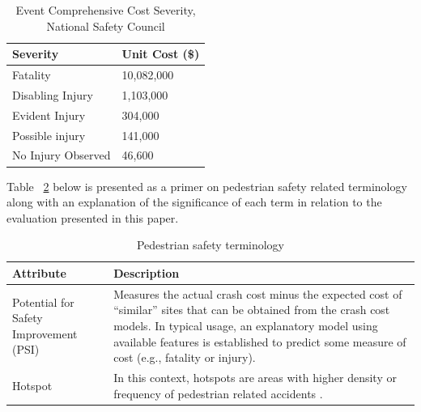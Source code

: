 \documentclass{llncs}
\begin{document}
%
\FloatBarrier
\begin{table}[!h]
\begin{center}
\caption{Event Comprehensive Cost Severity, National Safety Council}
\label{table:eventseverity}
\begin{tabular}{p{50mm}  p{50mm}}
\hline
\rule{0pt}{12pt}
Severity & Unit Cost (\$)\\[2pt]
\hline
Fatality 			&10,082,000\\
Disabling Injury 		&1,103,000\\
Evident Injury 		&304,000\\
Possible injury 		&141,000\\
No Injury Observed		&46,600\\[2pt]
\hline
\end{tabular}
\end{center}
\end{table}
\FloatBarrier
%
Table ~\ref{table:terminology} below is presented as a primer on pedestrian safety related terminology along with an explanation of the significance of each term in relation to the evaluation presented in this paper.
%
\FloatBarrier
\begin{table}[!ht]
\caption{Pedestrian safety terminology}
\label{table:terminology}
\begin{center}
\begin{tabular}{p{40mm}  p{80mm}}
\hline
\rule{0pt}{12pt}
Attribute & Description\\[2pt]
\hline
Potential for Safety Improvement (PSI)	&	Measures the actual crash cost minus the expected cost of “similar” sites that can be obtained from the crash cost models. In typical usage, an explanatory model using available features is established to predict some measure of cost (e.g., fatality or injury). \cite{ohgov2017} \\		
Hotspot & In this context, hotspots are areas with higher density or frequency of pedestrian related accidents \cite{xie2017analysis}. 	\\	[2pt]
\hline
\end{tabular}
\end{center}	
\end{table}
\FloatBarrier	
\end{document}
